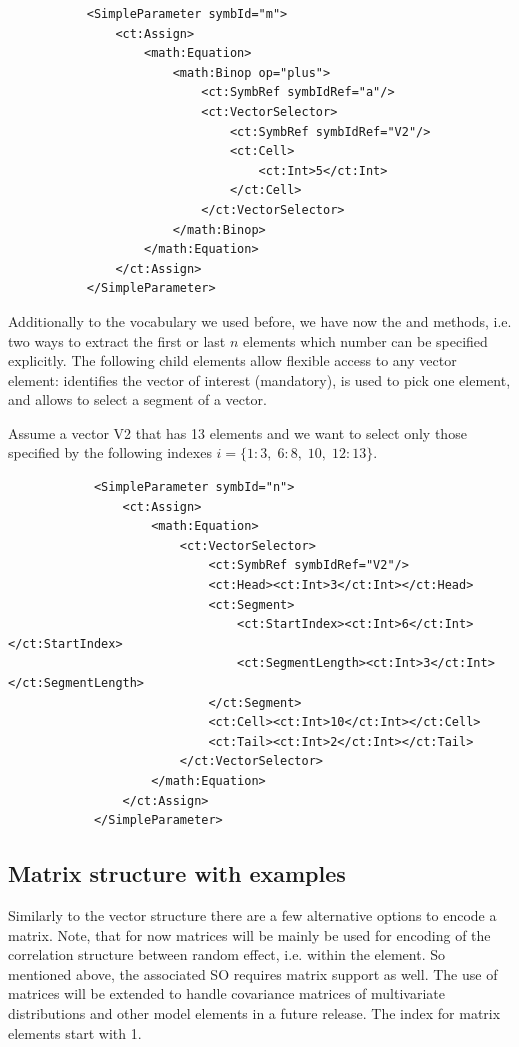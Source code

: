 \lstset{language=XML}
\begin{lstlisting}
           <SimpleParameter symbId="m">
               <ct:Assign>
                   <math:Equation>
                       <math:Binop op="plus">
                           <ct:SymbRef symbIdRef="a"/>
                           <ct:VectorSelector>
                               <ct:SymbRef symbIdRef="V2"/>
                               <ct:Cell>
                                   <ct:Int>5</ct:Int>
                               </ct:Cell>
                           </ct:VectorSelector>
                       </math:Binop>
                   </math:Equation>
               </ct:Assign>
           </SimpleParameter>
\end{lstlisting}

Additionally to the vocabulary we used before, we have now the  and  
methods, i.e. two ways to extract the first or last $n$ elements which number can be specified
explicitly. The following child elements allow flexible access to any vector element: 
 identifies the vector of interest (mandatory), 
 is used to pick one element, and
 allows to select a segment of a vector.


Assume a vector V2 that has 13 elements and we want to select only those specified by the
following indexes $i=\{1:3,\;6:8,\;10,\;12:13\}.$
\lstset{language=XML}
\begin{lstlisting}
            <SimpleParameter symbId="n">
                <ct:Assign>
                    <math:Equation>
                        <ct:VectorSelector>
                            <ct:SymbRef symbIdRef="V2"/>
                            <ct:Head><ct:Int>3</ct:Int></ct:Head>
                            <ct:Segment>
                                <ct:StartIndex><ct:Int>6</ct:Int></ct:StartIndex>
                                <ct:SegmentLength><ct:Int>3</ct:Int></ct:SegmentLength>
                            </ct:Segment>
                            <ct:Cell><ct:Int>10</ct:Int></ct:Cell>
                            <ct:Tail><ct:Int>2</ct:Int></ct:Tail>
                        </ct:VectorSelector>
                    </math:Equation>
                </ct:Assign>
            </SimpleParameter>
\end{lstlisting}


\subsection{Matrix structure with examples}
\label{subsec:matrixStructure}
Similarly to the vector structure there are a few alternative options to encode a matrix.
Note, that for now matrices will be mainly be used for encoding of the correlation structure 
between random effect, i.e. within the  element. So mentioned above,
the associated SO requires matrix support as well. The use of matrices will be extended to 
handle covariance matrices of multivariate distributions and other model elements in 
a future release. The index for matrix elements start with 1.

